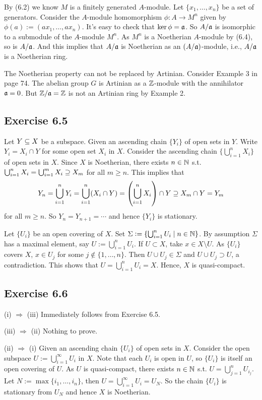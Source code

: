 \documentclass[../A&M.tex]{subfiles}
\begin{document}
By (6.2) we know $M$ is a finitely generated $A$-module. Let $\{x_1,\ldots,x_n\}$ be a set of generators. Consider the $A$-module homomorphism $\phi: A \to M^n$ given by $\phi(a) := (ax_1,\ldots,ax_n)$. It's easy to check that $\ker \phi = \mathfrak{a}$. So $A/\mathfrak{a}$ is isomorphic to a submodule of the $A$-module $M^n$. As $M^n$ is a Noetherian $A$-module by (6.4), so is $A/\mathfrak{a}$. And this implies that $A/\mathfrak{a}$ is Noetherian as an $(A/\mathfrak{a})$-module, i.e., $A/\mathfrak{a}$ is a Noetherian ring.

The Noetherian property can not be replaced by Artinian. Consider Example 3 in page 74. The abelian group $G$ is Artinian as a $\mathbb{Z}$-module with the annihilator $\mathfrak{a}=0$. But $\mathbb{Z}/\mathfrak{a} = \mathbb{Z}$ is not an Artinian ring by Example 2.

\subsection*{Exercise 6.5}

Let $Y\subseteq X$ be a subspace. Given an ascending chain $\{Y_i\}$ of open sets in $Y$. Write $Y_i = X_i \cap Y$ for some open set $X_i$ in $X$. Consider the ascending chain $\{\bigcup_{i=1}^n X_i\}$ of open sets in $X$. Since $X$ is Noetherian, there exists $n\in\mathbb{N}$ s.t. $\bigcup_{i=1}^n X_i = \bigcup_{i=1}^m X_i \supseteq X_m$ for all $m\geq n$. This implies that
$$
Y_n = \bigcup_{i=1}^n Y_i = \bigcup_{i=1}^n (X_i \cap Y) = \left( \bigcup_{i=1}^n X_i \right) \cap Y \supseteq X_m \cap Y = Y_m
$$
for all $m\geq n$. So $Y_n = Y_{n+1} = \cdots$ and hence $\{Y_i\}$ is stationary.

Let $\{U_i\}$ be an open covering of $X$. Set $\Sigma := \{ \bigcup_{i=1}^n U_i \mid n\in\mathbb{N} \}$. By assumption $\Sigma$ has a maximal element, say $U := \bigcup_{i=1}^n U_i$. If $U \subset X$, take $x \in X \setminus U$. As $\{U_i\}$ covers $X$, $x\in U_j$ for some $j \notin \{1,\ldots,n\}$. Then $U \cup U_j \in \Sigma$ and $U \cup U_j \supset U$, a contradiction. This shows that $U = \bigcup_{i=1}^n U_i = X$. Hence, $X$ is quasi-compact.

\subsection*{Exercise 6.6}

(i) $\Rightarrow$ (iii) Immediately follows from Exercise 6.5.

(iii) $\Rightarrow$ (ii) Nothing to prove.

(ii) $\Rightarrow$ (i) Given an ascending chain $\{U_i\}$ of open sets in $X$. Consider the open subspace $U:=\bigcup_{i=1}^\infty U_i$ in $X$. Note that each $U_i$ is open in $U$, so $\{U_i\}$ is itself an open covering of $U$. As $U$ is quasi-compact, there exists $n\in\mathbb{N}$ s.t. $U = \bigcup_{j=1}^n U_{i_j}$. Let $N:=\max\{i_1,\ldots,i_n\}$, then $U = \bigcup_{i=1}^\infty U_i = U_N$. So the chain $\{U_i\}$ is stationary from $U_N$ and hence $X$ is Noetherian.
\end{document}
